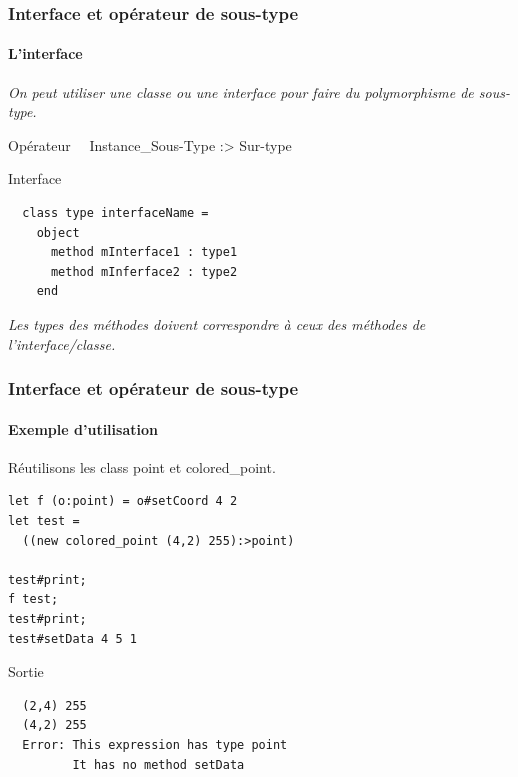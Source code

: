 \begin{frame}[fragile]
	\frametitle{Interface et opérateur de sous-type}
	\framesubtitle{L'interface}
	\textit{On peut utiliser une classe ou une interface pour faire du polymorphisme de sous-type.}
	\begin{block}{Opérateur}
		~~Instance\_Sous-Type \large{:>} Sur-type
	\end{block}
	\begin{block}{Interface}
		\begin{lstlisting}
  class type interfaceName =
    object
      method mInterface1 : type1
      method mInferface2 : type2
    end
		\end{lstlisting}
	\end{block}
	\textit{Les types des méthodes doivent correspondre à ceux des méthodes de l'interface/classe.}
\end{frame}

\begin{frame}[fragile]
	\frametitle{Interface et opérateur de sous-type}
	\framesubtitle{Exemple d'utilisation}
	Réutilisons les class point et colored\_point.
	\begin{lstlisting}
let f (o:point) = o#setCoord 4 2
let test =
  ((new colored_point (4,2) 255):>point)

test#print;
f test;
test#print;
test#setData 4 5 1
	\end{lstlisting}
	\begin{block}{Sortie}
		\begin{lstlisting}
  (2,4) 255
  (4,2) 255
  Error: This expression has type point
         It has no method setData
		\end{lstlisting}
	\end{block}
\end{frame}
